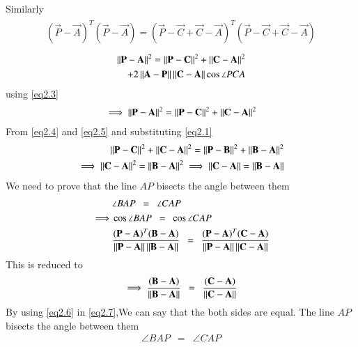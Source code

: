 \documentclass[journal,12pt,twocolumn]{IEEEtran}
\begin{document}
Similarly
\begin{align}
 \begin{split}
(\vec{P}-\vec{A})^T(\vec{P}-\vec{A})=(\vec{P}-\vec{C}+\vec{C}-\vec{A})^T(\vec{P}-\vec{C}+\vec{C}-\vec{A})
\end{split}
\end{align}
\begin{align}
 \begin{split}
\left\lVert\mathbf{P-A}\right\rVert^2=\left\lVert\mathbf{P-C}\right\rVert^2+\left\lVert\mathbf{C-A}\right\rVert^2\\ 
+2\left\lVert\mathbf{A}-\mathbf{P}\right\rVert\left\lVert\mathbf{C}-\mathbf{A}\right\rVert\cos\angle PCA \\
\end{split}
\end{align}
using \eqref{eq2.3}
\begin{align}
 \begin{split}
 \implies \left\lVert\mathbf{P-A}\right\rVert^2=\left\lVert\mathbf{P-C}\right\rVert^2+\left\lVert\mathbf{C-A}\right\rVert^2 \label{eq2.5}
 \end{split}
\end{align}
From \eqref{eq2.4} and \eqref{eq2.5} and substituting \eqref{eq2.1}
\begin{align}
\left\lVert\mathbf{P-C}\right\rVert^2+\left\lVert\mathbf{C-A}\right\rVert^2=\left\lVert\mathbf{P-B}\right\rVert^2+\left\lVert\mathbf{B-A}\right\rVert^2 \\
\implies \left\lVert\mathbf{C-A}\right\rVert^2=\left\lVert\mathbf{B-A}\right\rVert^2
\implies \left\lVert\mathbf{C-A}\right\rVert=\left\lVert\mathbf{B-A}\right\rVert \label{eq2.6}
\end{align}
We need to prove that the line  $AP$  bisects the angle between them
\begin{align}
 & \angle BAP \enspace = \enspace \angle CAP \label{1} \\
 \implies &\cos\angle BAP \enspace = \enspace \cos\angle CAP \\
 &  \frac{(\mathbf P -\mathbf A)^T(\mathbf{B}-\mathbf{A})}{\left\lVert\mathbf{P}-\mathbf{A}\right\rVert \left\lVert\mathbf{B}-\mathbf{A}\right\rVert } \enspace = \enspace \frac{(\mathbf P -\mathbf A)^T(\mathbf{C}-\mathbf{A})}{\left\lVert\mathbf{P}-\mathbf{A}\right\rVert \left\lVert\mathbf{C}-\mathbf{A}\right\rVert }
 \end{align}
 This is reduced to
 \begin{align}
 \implies 
 \frac{(\mathbf B -\mathbf A)}{\left\lVert\mathbf{B}-\mathbf{A}\right\rVert} \enspace = \enspace \frac{(\mathbf C -\mathbf A)}{\left\lVert\mathbf{C}-\mathbf{A}\right\rVert} \label{eq2.7}
\end{align}
  By using \eqref{eq2.6} in \eqref{eq2.7},We can say that the both sides are equal. The line $AP$ bisects the angle between them
  \begin{align}
  \angle BAP \enspace = \enspace \angle CAP
  \end{align}
\end{document}

